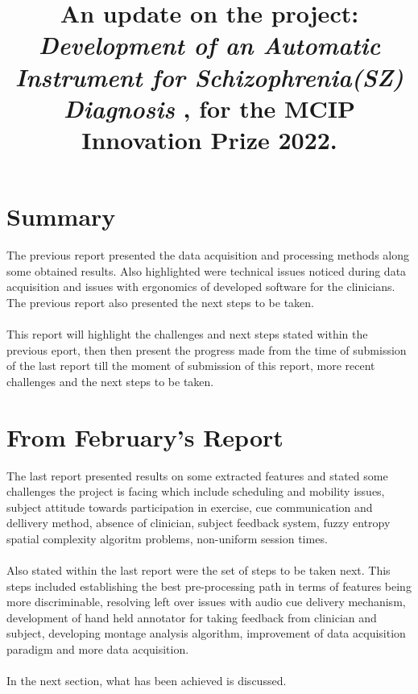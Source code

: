 \documentclass[10pt]{article}
\title{
  An update on the project: 
  \textbf{
      \textit{
        Development of an Automatic Instrument for Schizophrenia(SZ) Diagnosis
        }
      }, for the MCIP Innovation Prize 2022.
  }
\begin{document}
\maketitle

\section{Summary}
The previous report presented the data acquisition and processing methods along some obtained 
results. Also highlighted were technical issues noticed during data acquisition and 
issues with ergonomics of developed software for the clinicians. The previous report also 
presented the next steps to be taken.\\
\\
This report will highlight the challenges and next steps stated within the previous eport, then 
then present the progress made from the time of submission of the last report till the moment of 
submission of this report, more recent challenges and the next steps to be taken.

\section{From February's Report}
The last report presented results on some extracted features and stated some challenges the project is 
facing which include scheduling and mobility issues, 
subject attitude towards participation in exercise, cue communication and dellivery method, absence of 
clinician, subject feedback system, fuzzy entropy spatial complexity algoritm problems, non-uniform session times.\\
\\
Also stated within the last report were the set of steps to be taken next. This steps included establishing 
the best pre-processing path in terms of features being more discriminable, resolving left over issues 
with audio cue delivery mechanism, development of hand held annotator for taking feedback from clinician and 
subject, developing montage analysis algorithm, improvement of data acquisition paradigm and more data acquisition.\\
\\
In the next section, what has been achieved is discussed.
\end{document}

